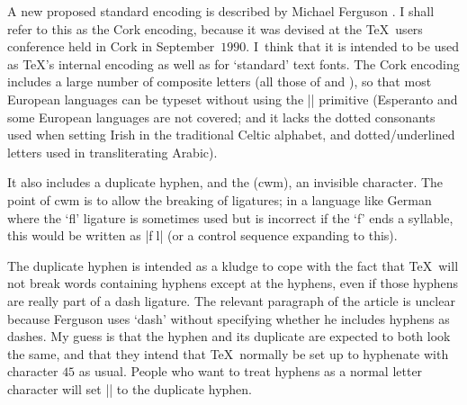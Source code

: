 	A new proposed standard encoding is described by Michael
	Ferguson \cite{Cork}.  I shall refer to this as the Cork
	encoding, because it was devised at the \TeX\ users conference
	held in Cork in September~$1990$. I~think that it is intended to
	be used as \TeX's internal encoding as well as for `standard'
	text fonts. The Cork encoding includes a large
	number of composite letters (all those of  and
	), so that most European languages can be typeset
	without using the |\accent| primitive (Esperanto and some
	European languages are not covered; and it lacks the dotted
	consonants used when setting Irish in the traditional Celtic
	alphabet, and dotted/underlined letters used in transliterating
	Arabic).

	It also includes a duplicate hyphen, and the  (cwm), an invisible character.  The point of cwm is to
	allow the breaking of ligatures; in a language like German where
	the `fl' ligature is sometimes used but is incorrect if the `f'
	ends a syllable, this would be written as |f^^Wl| (or a control
	sequence expanding to this).

	The duplicate hyphen is intended as a kludge to cope with the
	fact that \TeX\ will not break words containing hyphens except
	at the hyphens, even if those hyphens are really part of a dash
	ligature.  The relevant paragraph of the article is
	unclear because Ferguson uses `dash' without specifying whether
	he includes hyphens as dashes.  My guess is that the hyphen and
	its duplicate are expected to both look the same, and that they
	intend that \TeX\ normally be set up to hyphenate with character
	$45$ as usual.  People who want to treat hyphens as a normal
	letter character will set |\hyphenchar| to the duplicate hyphen.

